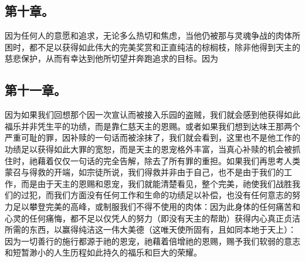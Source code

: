 
\subsection{第十章。}

\par

因为任何人的意愿和追求，无论多么热切和焦虑，当他仍被那与灵魂争战的肉体所困时，都不足以获得如此伟大的完美奖赏和正直纯洁的棕榈枝，除非他得到天主的慈悲保护，从而有幸达到他所切望并奔跑追求的目标。因为\par


\subsection{第十一章。}

\par

因为如果我们回想那个因一次宣认而被接入乐园的盗贼，我们就会感到他获得如此福乐并非凭生平的功绩，而是靠仁慈天主的恩赐。或者如果我们想到达味王那两个严重可耻的罪，因补赎的一句话而被涂抹了，我们就会看到，这里也不是他工作的功绩足以获得如此大罪的宽恕，而是天主的恩宠格外丰富，当真心补赎的机会被抓住时，祂藉着仅仅一句话的完全告解，除去了所有罪的重担。如果我们再思考人类蒙召与得救的开端，如宗徒所说，我们得救并非由于自己，也不是由于我们的工作，而是由于天主的恩赐和恩宠，我们就能清楚看见，整个完美，祂使我们战胜我们的过犯，而我们方面没有任何工作和生命的功绩足以补偿，也没有任何意志的努力足以攀登完美的高峰，或制服我们不得不使用的肉体：因为此身体的任何痛苦和心灵的任何痛悔，都不足以仅凭人的努力（即没有天主的帮助）获得内心真正贞洁所需的东西，以赢得纯洁这一伟大美德（这唯天使所固有，且如同本地于天上）：因为一切善行的施行都源于祂的恩宠，祂藉着倍增祂的恩赐，赐予我们软弱的意志和短暂渺小的人生历程如此持久的福乐和巨大的荣耀。\par


